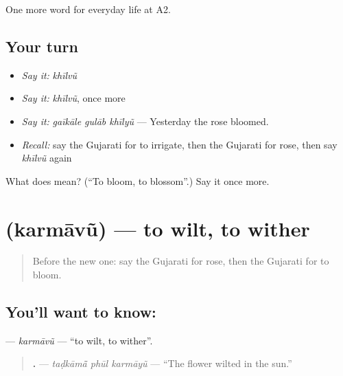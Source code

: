 \begin{grammarlens}[title={What you've built}]
One more word for everyday life at A2.
\end{grammarlens}

\subsection*{Your turn}
\begin{itemize}
\raggedright
  \item \emph{Say it:} \emph{khīlvũ}
  \item \emph{Say it:} \emph{khīlvũ}, once more
  \item \emph{Say it:} \emph{gaīkāle gulāb khīlyũ} — Yesterday the rose bloomed.
  \item \emph{Recall:} say the Gujarati for to irrigate, then the Gujarati for rose, then say \emph{khīlvũ} again
\end{itemize}

\begin{tcolorbox}[breakable,colback=teal!4,colframe=teal!35!black,title={Before you move on}]
What does  mean? (\textquotedblleft{}To bloom, to blossom\textquotedblright{}.) Say it once more.
\end{tcolorbox}
\section[\texorpdfstring{\gu{કરમાવું} (karmāvũ)}{કરમાવું (karmāvũ)}]{ (karmāvũ) — to wilt, to wither}

\label{lesson:GU-C241-karmavu}



\begin{quote}
Before the new one: say the Gujarati for rose, then the Gujarati for to bloom.
\end{quote}

\subsection*{You'll want to know: }
\textbf{} — \emph{karmāvũ} — \textquotedblleft{}to wilt, to wither\textquotedblright{}.

\begin{quote}
\textbf{  .} — \emph{taḍkāmā̃ phūl karmāyũ} — \textquotedblleft{}The flower wilted in the sun.\textquotedblright{}
\end{quote}

